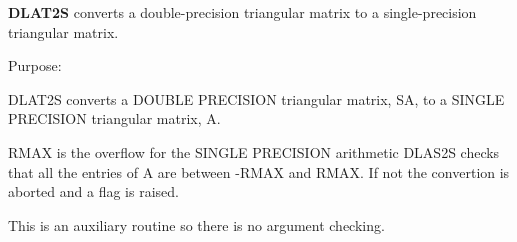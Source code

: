 {\bfseries D\+L\+A\+T2\+S} converts a double-\/precision triangular matrix to a single-\/precision triangular matrix. 

 \begin{DoxyParagraph}{Purpose\+: }
\begin{DoxyVerb} DLAT2S converts a DOUBLE PRECISION triangular matrix, SA, to a SINGLE
 PRECISION triangular matrix, A.

 RMAX is the overflow for the SINGLE PRECISION arithmetic
 DLAS2S checks that all the entries of A are between -RMAX and
 RMAX. If not the convertion is aborted and a flag is raised.

 This is an auxiliary routine so there is no argument checking.\end{DoxyVerb}
 
\end{DoxyParagraph}

